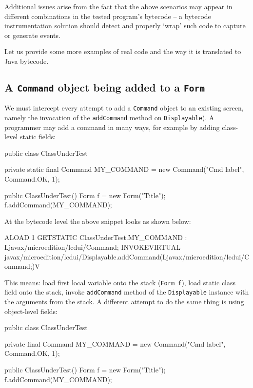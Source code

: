 Additional issues arise from the fact that the above scenarios may appear in different combinations
in the tested program's bytecode -- a bytecode instrumentation solution should detect and properly 
`wrap' such code to capture or generate events.  

Let us provide some more examples of real code and the way it is translated to Java bytecode.

\subsection{A \texttt{Command} object being added to a \texttt{Form}}\label{sect:fiugvuieg}

We must intercept every attempt to add a \texttt{Command} object to an existing screen, namely
the invocation of the \texttt{addCommand} method on \texttt{Displayable}). 
A programmer may add a command in many ways, for example by adding class-level 
static fields:

\begin{javablock}
public class ClassUnderTest {
    private static final Command MY_COMMAND = new Command("Cmd label", Command.OK, 1);

    public ClassUnderTest() {
        Form f = new Form("Title");
        f.addCommand(MY_COMMAND);
    }
}
\end{javablock}

\noindent%
At the bytecode level the above snippet looks as shown below:

\begin{javablock}
ALOAD 1
GETSTATIC ClassUnderTest.MY_COMMAND : Ljavax/microedition/lcdui/Command;
INVOKEVIRTUAL javax/microedition/lcdui/Displayable.addCommand(Ljavax/microedition/lcdui/Command;)V
\end{javablock}

\noindent%
This means: load first local variable onto the stack (\texttt{Form f}), load static class field onto the stack, 
invoke \texttt{addCommand} method of the \texttt{Displayable} instance with the arguments from the stack.
A different attempt to do the same thing is using object-level fields:

\begin{javablock}
public class ClassUnderTest {
    private final Command MY_COMMAND = new Command("Cmd label", Command.OK, 1);

    public ClassUnderTest() {
        Form f = new Form("Title");
        f.addCommand(MY_COMMAND);
    }
}
\end{javablock}

